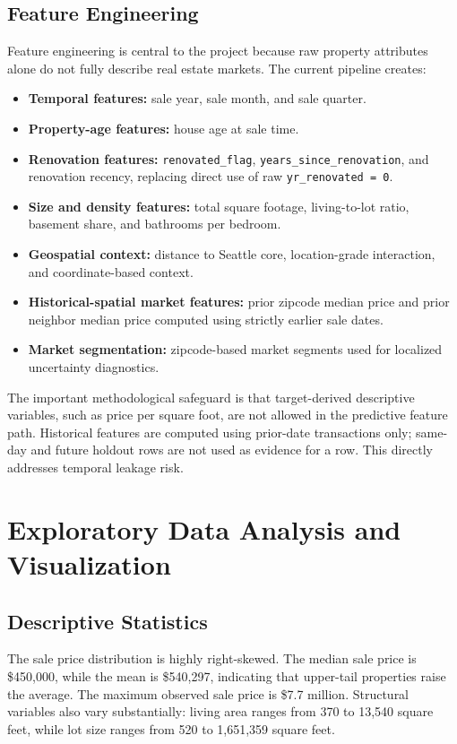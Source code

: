 \documentclass[12pt,a4paper]{article}
\begin{document}
\subsection{Feature Engineering}
Feature engineering is central to the project because raw property attributes alone do not fully describe real estate markets. The current pipeline creates:
\begin{itemize}
    \item \textbf{Temporal features:} sale year, sale month, and sale quarter.
    \item \textbf{Property-age features:} house age at sale time.
    \item \textbf{Renovation features:} \texttt{renovated\_flag}, \texttt{years\_since\_renovation}, and renovation recency, replacing direct use of raw \texttt{yr\_renovated = 0}.
    \item \textbf{Size and density features:} total square footage, living-to-lot ratio, basement share, and bathrooms per bedroom.
    \item \textbf{Geospatial context:} distance to Seattle core, location-grade interaction, and coordinate-based context.
    \item \textbf{Historical-spatial market features:} prior zipcode median price and prior neighbor median price computed using strictly earlier sale dates.
    \item \textbf{Market segmentation:} zipcode-based market segments used for localized uncertainty diagnostics.
\end{itemize}

The important methodological safeguard is that target-derived descriptive variables, such as price per square foot, are not allowed in the predictive feature path. Historical features are computed using prior-date transactions only; same-day and future holdout rows are not used as evidence for a row. This directly addresses temporal leakage risk.

\section{Exploratory Data Analysis and Visualization}

\subsection{Descriptive Statistics}
The sale price distribution is highly right-skewed. The median sale price is \$450,000, while the mean is \$540,297, indicating that upper-tail properties raise the average. The maximum observed sale price is \$7.7 million. Structural variables also vary substantially: living area ranges from 370 to 13,540 square feet, while lot size ranges from 520 to 1,651,359 square feet.
\end{document}
